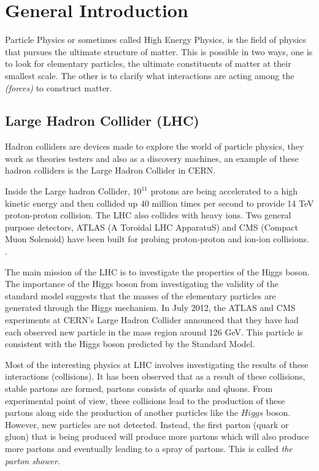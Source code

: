 \chapter{General Introduction}
Particle Physics or sometimes called High Energy Physics, is the field of physics that pursues the ultimate structure of matter. This is possible in two ways, one is to look for elementary particles, the ultimate constituents of matter at their smallest scale. The other is to clarify what interactions are acting among the
\emph{(forces)} to construct matter.



\section{Large Hadron Collider (LHC)}

Hadron colliders are devices made to explore the world of particle physics, they work as theories testers and also as a discovery machines, an example of these hadron colliders is the Large Hadron Collider in CERN.

Inside the Large hadron Collider, $10^{11}$ protons are being accelerated to a high kinetic energy and then collided up 40 million times per second to provide 14 \si{TeV} proton-proton collision. The LHC also collides with heavy ions. Two general purpose detectors, ATLAS (A Toroidal LHC ApparatuS) and CMS (Compact Muon Solenoid) have been built for probing proton-proton and ion-ion collisions. \citep{Aad:2012tfa}.

The main mission of the LHC is to investigate the properties of the Higgs boson. The importance of the Higgs boson from investigating the validity of the standard model suggests that the masses of the elementary particles are generated through the Higgs mechanism. In July 2012, the ATLAS and CMS experiments at CERN's Large Hadron Collider announced that they have had each observed new particle in the mass region around 126 GeV. This particle is consistent with the Higgs boson predicted by the Standard Model.  
 
Most of the interesting physics at LHC involves investigating the results of these interactions (collisions). It has been observed that as a result of these collisions, stable partons are formed, partons consists of quarks and qluons. From experimental point of view, these collisions lead to the production of these partons along side the production of another particles like the $Higgs$ boson. However, new particles are not detected. Instead, the first parton (quark or gluon) that is being produced will produce more partons which  will also produce more partons and eventually leading to a spray of partons. This is called \textit{the parton shower}.      


